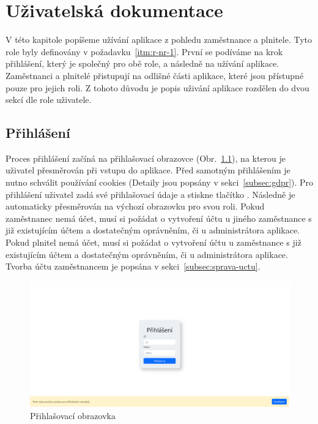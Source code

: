 \chapter{Uživatelská dokumentace}\label{ch:uzivatelska-dokumentace}

V této kapitole popíšeme užívání aplikace z pohledu zaměstnance a plnitele.
Tyto role byly definovány v požadavku~\ref{itm:r-nr-1}.
První se podíváme na krok přihlášení, který je společný pro obě role, a následně na užívání aplikace.
Zaměstnanci a plnitelé přistupují na odlišné části aplikace, které jsou přístupné pouze pro jejich roli.
Z tohoto důvodu je popis uživání aplikace rozdělen do dvou sekcí dle role uživatele.


\section{Přihlášení}\label{sec:prihlaseni}

Proces přihlášení začíná na přihlašovací obrazovce (Obr.~\ref{fig:login-screenshot}), na kterou je uživatel přesměrován při vstupu do aplikace.
Před samotným přihlášením je nutno schválit používání cookies (Detaily jsou popsány v sekci~\ref{subsec:gdpr}).
Pro přihlášení uživatel zadá své přihlašovací údaje a stiskne tlačítko .
Následně je automaticky přesměrován na výchozí obrazovku pro svou roli.
Pokud zaměstnanec nemá účet, musí si požádat o vytvoření účtu u jiného zaměstnance s již existujícím účtem a dostatečným oprávněním, či u administrátora aplikace.
Pokud plnitel nemá účet, musí si požádat o vytvoření účtu u zaměstnance s již existujícím účtem a dostatečným oprávněním, či u administrátora aplikace.
Tvorba účtu zaměstnancem je popsána v sekci~\ref{subsec:sprava-uctu}.

\begin{figure}[H]
    \centering
    \includegraphics[width=\textwidth]{../img/screenshots/login}
    \caption{Přihlašovací obrazovka}\label{fig:login-screenshot}
\end{figure}


